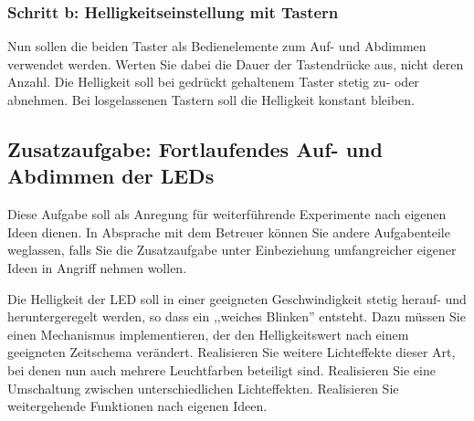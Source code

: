 \documentclass[a4paper,12pt,titlepage]{scrartcl}
\begin{document}
\subsubsection*{Schritt b: Helligkeitseinstellung mit Tastern}
Nun sollen die beiden Taster als Bedienelemente zum Auf- und Abdimmen verwendet werden. Werten Sie dabei die Dauer der Tastendrücke aus, nicht deren Anzahl. Die Helligkeit soll bei gedrückt gehaltenem Taster stetig zu- oder abnehmen. Bei losgelassenen Tastern soll die Helligkeit konstant bleiben.

\subsection*{Zusatzaufgabe: Fortlaufendes Auf- und Abdimmen der LEDs}
Diese Aufgabe soll als Anregung für weiterführende Experimente nach eigenen Ideen dienen. In Absprache mit dem Betreuer können Sie andere Aufgabenteile weglassen, falls Sie die Zusatzaufgabe unter Einbeziehung umfangreicher eigener Ideen in Angriff nehmen wollen.

Die Helligkeit der LED soll in einer geeigneten Geschwindigkeit stetig herauf- und heruntergeregelt werden, so dass ein ,,weiches Blinken'' entsteht. Dazu müssen Sie einen Mechanismus implementieren, der den Helligkeitswert nach einem geeigneten Zeitschema verändert.
Realisieren Sie weitere Lichteffekte dieser Art, bei denen nun auch mehrere Leuchtfarben beteiligt sind.
Realisieren Sie eine Umschaltung zwischen unterschiedlichen Lichteffekten.
Realisieren Sie weitergehende Funktionen nach eigenen Ideen.
\end{document}
